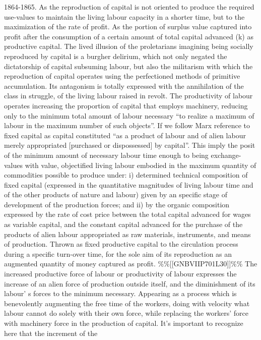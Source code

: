 \documentclass[
]{article}
\begin{document}
1864-1865. As the reproduction of capital is not oriented to produce the
required use-values to maintain the living labour capacity in a shorter
time, but to the maximization of the rate of profit. As the portion of
surplus value captured into profit after the consumption of a certain
amount of total capital advanced (k) as productive capital. The lived
illusion of the proletarians imagining being socially reproduced by
capital is a burgher delirium, which not only negated the dictatorship
of capital subsuming labour, but also the militarism with which the
reproduction of capital operates using the perfectioned methods of
primitive accumulation. Its antagonism is totally expressed with the
annihilation of the class in struggle, of the living labour raised in
revolt. The productivity of labour operates increasing the proportion of
capital that employs machinery, reducing only to the minimum total
amount of labour necessary ``to realize a maximum of labour in the
maximum number of such objects''. If we follow Marx reference to fixed
capital as capital constituted ``as a product of labour and of alien
labour merely appropriated {[}purchased or dispossessed{]} by capital''.
This imply the posit of the minimum amount of necessary labour time
enough to being exchange-values with value, objectified living labour
embodied in the maximum quantity of commodities possible to produce
under: i) determined technical composition of fixed capital (expressed
in the quantitative magnitudes of living labour time and of the other
products of nature and labour) given by an specific stage of development
of the production forces; and ii) by the organic composition expressed
by the rate of cost price between the total capital advanced for wages
as variable capital, and the constant capital advanced for the purchase
of the products of alien labour appropriated as raw materials,
instruments, and means of production. Thrown as fixed productive capital
to the circulation process during a specific turn-over time, for the
sole aim of its reproduction as an augmented quantity of money captured
as profit. \%\%{[}{[}GNBVIIP701L30{]}{]}\%\% The increased productive
force of labour or productivity of labour expresses the increase of an
alien force of production outside itself, and the diminishment of its
labour' s forces to the minimum necessary. Appearing as a process which
is benevolently augmenting the free time of the workers, doing with
velocity what labour cannot do solely with their own force, while
replacing the workers' force with machinery force in the production of
capital. It's important to recognize here that the increment of the
\end{document}
